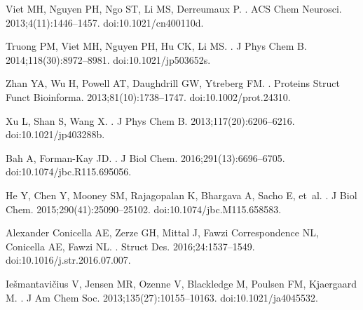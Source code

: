 \documentclass[10pt,letterpaper]{article}
\begin{document}
\begin{thebibliography}{10}
Viet MH, Nguyen PH, Ngo ST, Li MS, Derreumaux P.
.
\newblock ACS Chem Neurosci. 2013;4(11):1446--1457.
\newblock doi:{10.1021/cn400110d}.

Truong PM, Viet MH, Nguyen PH, Hu CK, Li MS.
.
\newblock J Phys Chem B. 2014;118(30):8972--8981.
\newblock doi:{10.1021/jp503652s}.

Zhan YA, Wu H, Powell AT, Daughdrill GW, Ytreberg FM.
.
\newblock Proteins Struct Funct Bioinforma. 2013;81(10):1738--1747.
\newblock doi:{10.1002/prot.24310}.

Xu L, Shan S, Wang X.
.
\newblock J Phys Chem B. 2013;117(20):6206--6216.
\newblock doi:{10.1021/jp403288b}.

Bah A, Forman-Kay JD.
.
\newblock J Biol Chem. 2016;291(13):6696--6705.
\newblock doi:{10.1074/jbc.R115.695056}.

He Y, Chen Y, Mooney SM, Rajagopalan K, Bhargava A, Sacho E, et~al.
.
\newblock J Biol Chem. 2015;290(41):25090--25102.
\newblock doi:{10.1074/jbc.M115.658583}.

{Alexander Conicella} AE, Zerze GH, Mittal J, {Fawzi Correspondence} NL,
  Conicella AE, Fawzi NL.
.
\newblock Struct Des. 2016;24:1537--1549.
\newblock doi:{10.1016/j.str.2016.07.007}.

Ie{\v{s}}mantavi{\v{c}}ius V, Jensen MR, Ozenne V, Blackledge M, Poulsen FM,
  Kjaergaard M.
.
\newblock J Am Chem Soc. 2013;135(27):10155--10163.
\newblock doi:{10.1021/ja4045532}.


\end{thebibliography}
\end{document}

